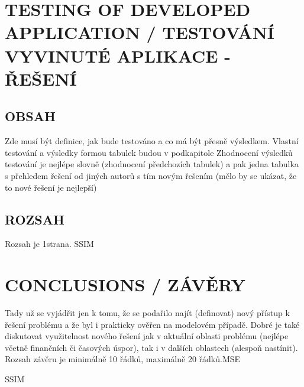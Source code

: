 \documentclass[journal]{IEEEtran}
\begin{document}
\section{TESTING OF DEVELOPED APPLICATION / TESTOVÁNÍ VYVINUTÉ APLIKACE - ŘEŠENÍ}
\subsection{OBSAH}
Zde musí být definice, jak bude testováno a co má být přesně výsledkem.
Vlastní testování a výsledky formou tabulek budou v podkapitole
Zhodnocení výsledků testování je nejlépe slovně (zhodnocení předchozích tabulek) a pak jedna tabulka s přehledem řešení od jiných autorů s tím novým řešením (mělo by se ukázat, že to nové řešení je nejlepší)
\subsection{ROZSAH}
Rozsah je 1strana. \ac{SSIM}



\section{CONCLUSIONS / ZÁVĚRY}
Tady už se vyjádřit jen k tomu, že se podařilo najít (definovat) nový přístup k řešení problému a že byl i prakticky ověřen na modelovém případě. 
Dobré je také diskutovat využitelnost nového řešení jak v aktuální oblasti problému (nejlépe včetně finančních či časových úspor), tak i v dalších oblastech (alespoň nastínit).
Rozsah závěru je minimálně 10 řádků, maximálně 20 řádků.\ac{MSE}\cite{einstein}

\ac{SSIM}


\printbibliography

\printacronyms


\end{document}
